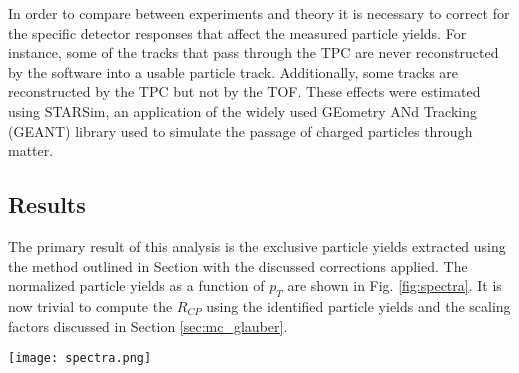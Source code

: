 	In order to compare between experiments and theory it is necessary to correct for the specific detector responses that affect the measured particle yields. For instance, some of the tracks that pass through the TPC are never reconstructed by the software into a usable particle track. Additionally, some tracks are reconstructed by the TPC but not by the TOF. These effects were estimated using STARSim, an application of the widely used GEometry ANd Tracking (GEANT) library used to simulate the passage of charged particles through matter. 


\subsection{ Results}

	The primary result of this analysis is the exclusive particle yields extracted using the method outlined in Section  with the discussed corrections applied. The normalized particle yields as a function of $p_T$ are shown in Fig. \ref{fig:spectra}. It is now trivial to compute the $R_{CP}$ using the identified particle yields and the scaling factors discussed in Section \ref{sec:mc_glauber}. 

	\begin{sidewaysfigure}[ht]
		\centering 
		\texttt{[image: spectra.png]} 
		\caption{ \label{fig:spectra} The corrected exclusive particle yields in the rapidity range $-0.25 \leq y \leq 0.25 $ for positive pions (top left), negative pions (bottom left), protons (top right), and anti-protons (bottom right). The spectra for each centrality is shown in a different color and scaled by successive factors of 10. } 
	\end{sidewaysfigure}



